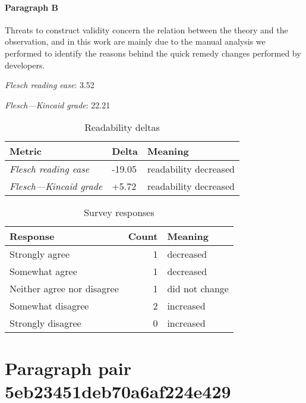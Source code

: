 \paragraph{Paragraph B}
Threats to construct validity concern the relation between the theory and the observation, and in this work are mainly due to the manual analysis we performed to identify the reasons behind the quick remedy changes performed by developers.\par\medskip
\emph{Flesch reading ease}: 3.52\par
\emph{Flesch---Kincaid grade}: 22.21

\bigskip\begin{table}[!h]
\centering
\begin{tabular}{lll}
\toprule
               \textbf{Metric} & \textbf{Delta} &       \textbf{Meaning} \\
\midrule
    \emph{Flesch reading ease} &         -19.05 &  readability decreased \\
 \emph{Flesch---Kincaid grade} &          +5.72 &  readability decreased \\
\bottomrule
\end{tabular}
\caption*{Readability deltas}\end{table}

\begin{table}[!h]
\centering
\begin{tabular}{lrl}
\toprule
          \textbf{Response} &  \textbf{Count} & \textbf{Meaning} \\
\midrule
             Strongly agree &               1 &        decreased \\
             Somewhat agree &               1 &        decreased \\
 Neither agree nor disagree &               1 &   did not change \\
          Somewhat disagree &               2 &        increased \\
          Strongly disagree &               0 &        increased \\
\bottomrule
\end{tabular}
\caption*{Survey responses}\end{table}


\newpage
\section{Paragraph pair 5eb23451deb70a6af224e429}
